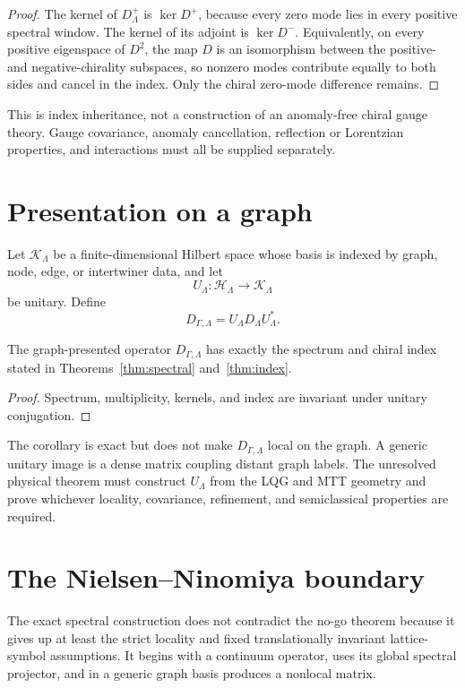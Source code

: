 \documentclass[11pt]{article}
\newcommand{\Hcal}{\mathcal H}
\newcommand{\Kcal}{\mathcal K}
\begin{document}
\begin{proof}
The kernel of \(D^+_\Lambda\) is \(\ker D^+\), because every zero mode lies
in every positive spectral window. The kernel of its adjoint is
\(\ker D^-\). Equivalently, on every positive eigenspace of \(D^2\), the map
\(D\) is an isomorphism between the positive- and negative-chirality
subspaces, so nonzero modes contribute equally to both sides and cancel in
the index. Only the chiral zero-mode difference remains.
\end{proof}

This is index inheritance, not a construction of an anomaly-free chiral
gauge theory. Gauge covariance, anomaly cancellation, reflection or
Lorentzian properties, and interactions must all be supplied separately.

\section{Presentation on a graph}

Let \(\Kcal_\Lambda\) be a finite-dimensional Hilbert space whose basis is
indexed by graph, node, edge, or intertwiner data, and let
\[
 U_\Lambda:\Hcal_\Lambda\longrightarrow\Kcal_\Lambda
\]
be unitary. Define
\[
 D_{\Gamma,\Lambda}
 =
 U_\Lambda D_\Lambda U_\Lambda^*.
\]

\begin{corollary}
\label{cor:graph}
The graph-presented operator \(D_{\Gamma,\Lambda}\) has exactly the spectrum
and chiral index stated in
Theorems~\ref{thm:spectral} and~\ref{thm:index}.
\end{corollary}

\begin{proof}
Spectrum, multiplicity, kernels, and index are invariant under unitary
conjugation.
\end{proof}

The corollary is exact but does not make \(D_{\Gamma,\Lambda}\) local on the
graph. A generic unitary image is a dense matrix coupling distant graph
labels. The unresolved physical theorem must construct \(U_\Lambda\) from
the LQG and MTT geometry and prove whichever locality, covariance,
refinement, and semiclassical properties are required.

\section{The Nielsen--Ninomiya boundary}

The exact spectral construction does not contradict the no-go theorem because
it gives up at least the strict locality and fixed translationally invariant
lattice-symbol assumptions. It begins with a continuum operator, uses its
global spectral projector, and in a generic graph basis produces a nonlocal
matrix.
\end{document}
